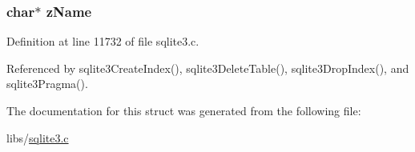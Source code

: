 \subsubsection[{z\+Name}]{\setlength{\rightskip}{0pt plus 5cm}char$\ast$ z\+Name}\label{struct_index_a661118d86ac4127d40bf3be78d92117d}


Definition at line 11732 of file sqlite3.\+c.



Referenced by sqlite3\+Create\+Index(), sqlite3\+Delete\+Table(), sqlite3\+Drop\+Index(), and sqlite3\+Pragma().



The documentation for this struct was generated from the following file\+:\begin{DoxyCompactItemize}
\item 
libs/\hyperlink{sqlite3_8c}{sqlite3.\+c}\end{DoxyCompactItemize}
